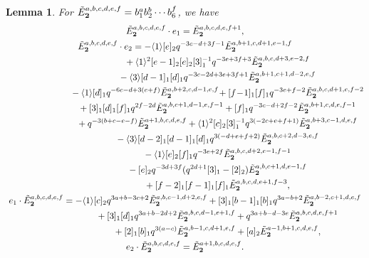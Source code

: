 \documentclass[11pt]{article}
\newtheorem{lemma}{Lemma}
\def\eshort{e_{1}}
\def\elong{e_{2}}
\def\qmq#1{\langle #1 \rangle}
\def\undividedB#1{{\tilde E}^{#1}_{\bf 2}}
\begin{document}
\begin{lemma} \label{lemma:rho-rep-G}
For $\undividedB{a,b,c,d,e,f}=b_1^a b_2^b\cdots b_6^f$, we have
\begin{gather*}
\undividedB{a,b,c,d,e,f} \cdot \eshort=
\undividedB{a,b,c,d,e,f+1},\\
\undividedB{a,b,c,d,e,f} \cdot \elong=
 -\qmq{1} [e]_2 q^{-3 c-d+3 f-1} \undividedB{a,b+1,c,d+1,e-1,f} \\
 \hphantom{\undividedB{a,b,c,d,e,f} \cdot \elong=}{}
 +\qmq{1}^2 [e-1]_2 [e]_2 [3]_1^{-1}q^{-3 e+3 f+3} \undividedB{a,b,c,d+3,e-2,f}\\
 \hphantom{\undividedB{a,b,c,d,e,f} \cdot \elong=}{}
 -\qmq{3} [d-1]_1 [d]_1 q^{-3 c-2 d+3 e+3 f+1} \undividedB{a,b+1,c+1,d-2,e,f}\\
 \hphantom{\undividedB{a,b,c,d,e,f} \cdot \elong=}{}
 -\qmq{1} [d]_1 q^{-6 c-d+3 (e+f)} \undividedB{a,b+2,c,d-1,e,f} \!
  +[f\!-\!1]_1 [f]_1 q^{-3 e+f-2} \undividedB{a,b,c,d+1,e,f-2}\\
\hphantom{\undividedB{a,b,c,d,e,f} \cdot \elong=}{}
 +[3]_1 [d]_1 [f]_1 q^{2 f-2 d} \undividedB{a,b,c+1,d-1,e,f-1}
 +[f]_1 q^{-3 c-d+2 f-2} \undividedB{a,b+1,c,d,e,f-1}\\
\hphantom{\undividedB{a,b,c,d,e,f} \cdot \elong=}{}
 +q^{-3 (b+c-e-f)} \undividedB{a+1,b,c,d,e,f}
 +\qmq{1}^2 [c]_2 [3]_1^{-1}q^{3 (-2 c+e+f+1)} \undividedB{a,b+3,c-1,d,e,f}\\
\hphantom{\undividedB{a,b,c,d,e,f} \cdot \elong=}{}
 -\qmq{3} [d-2]_1 [d-1]_1 [d]_1 q^{3 (-d+e+f+2)} \undividedB{a,b,c+2,d-3,e,f} \\
\hphantom{\undividedB{a,b,c,d,e,f} \cdot \elong=}{}
 -\qmq{1} [e]_2 [f]_1 q^{-3 e+2 f} \undividedB{a,b,c,d+2,e-1,f-1}\\
\hphantom{\undividedB{a,b,c,d,e,f} \cdot \elong=}{}
 -[e]_2 q^{-3 d+3 f} (q^{2d+1} [3]_1-[2]_2) \undividedB{a,b,c+1,d,e-1,f} \\
\hphantom{\undividedB{a,b,c,d,e,f} \cdot \elong=}{}
 +[f-2]_1 [f-1]_1 [f]_1 \undividedB{a,b,c,d,e+1,f-3},\\
\eshort \cdot \undividedB{a,b,c,d,e,f}=
 -\qmq{1} [c]_2 q^{3 a+b-3 c+2} \undividedB{a,b,c-1,d+2,e,f}
 +[3]_1 [b-1]_1 [b]_1 q^{3 a-b+2} \undividedB{a,b-2,c+1,d,e,f}\\
\hphantom{\eshort \cdot \undividedB{a,b,c,d,e,f}=}{}
 +[3]_1 [d]_1 q^{3 a+b-2 d+2} \undividedB{a,b,c,d-1,e+1,f}
 +q^{3 a+b-d-3 e} \undividedB{a,b,c,d,e,f+1}\\
\hphantom{\eshort \cdot \undividedB{a,b,c,d,e,f}=}{}
 +[2]_1 [b]_1 q^{3 (a-c)} \undividedB{a,b-1,c,d+1,e,f}
 +[a]_2 \undividedB{a-1,b+1,c,d,e,f},\\
 \elong \cdot \undividedB{a,b,c,d,e,f}=
\undividedB{a+1,b,c,d,e,f}.
\end{gather*}
\end{lemma}
\end{document}

